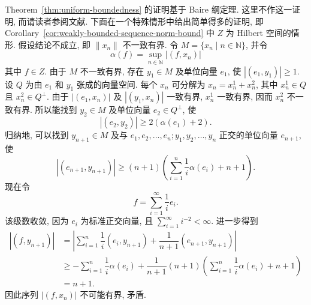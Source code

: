 Theorem~\ref{thm:uniform-boundedness} 的证明基于 Baire 纲定理. 这里不作这一证明, 而请读者参阅文献. 下面在一个特殊情形中给出简单得多的证明, 即 Corollary~\ref{cor:weakly-bounded-sequence-norm-bound} 中 $Z$ 为 Hilbert 空间的情形. 假设结论不成立, 即 $\|x_n\|$ 不一致有界. 令 $M=\{x_n\mid n\in\mathbb{N}\}$, 并令
\begin{equation}\label{eq:hilbert-unbounded-sequence-functional-supremum}
\alpha(f)=\sup_{n\in\mathbb{N}}|(f,x_n)|
\end{equation}
其中 $f\in Z$. 由于 $M$ 不一致有界, 存在 $y_1\in M$ 及单位向量 $e_1$, 使 $|(e_1,y_1)|\geq1$. 设 $Q$ 为由 $e_1$ 和 $y_1$ 张成的向量空间. 每个 $x_n$ 可分解为 $x_n=x_n^1+x_n^2$, 其中 $x_n^1\in Q$ 且 $x_n^2\in Q^\perp$. 由于 $|(e_1,x_n)|$ 及 $|(y_1,x_n)|$ 一致有界, $x_n^1$ 一致有界, 因而 $x_n^2$ 不一致有界. 所以能找到 $y_2\in M$ 及单位向量 $e_2\in Q^\perp$, 使
\begin{equation}\label{eq:hilbert-unbounded-sequence-second-vector}
|(e_2,y_2)|\geq2(\alpha(e_1)+2).
\end{equation}
归纳地, 可以找到 $y_{n+1}\in M$ 及与 $e_1,e_2,\ldots,e_n;y_1,y_2,\ldots,y_n$ 正交的单位向量 $e_{n+1}$, 使
\begin{equation}\label{eq:hilbert-unbounded-sequence-inductive-vectors}
|(e_{n+1},y_{n+1})|\geq(n+1)\left(\sum_{i=1}^n\dfrac{1}{i}\alpha(e_i)+n+1\right).
\end{equation}
现在令
\begin{equation}\label{eq:hilbert-unbounded-sequence-testing-series}
f=\sum_{i=1}^{\infty}\dfrac{1}{i}e_i.
\end{equation}
该级数收敛, 因为 $e_i$ 为标准正交向量, 且 $\sum_{i=1}^{\infty}i^{-2}<\infty$. 进一步得到
\begin{equation}\label{eq:hilbert-unbounded-sequence-contradiction}
\begin{aligned}
|(f,y_{n+1})|&=\left|\sum_{i=1}^n\dfrac{1}{i}(e_i,y_{n+1})+\dfrac{1}{n+1}(e_{n+1},y_{n+1})\right|\\
&\geq-\sum_{i=1}^n\dfrac{1}{i}\alpha(e_i)+\dfrac{1}{n+1}(n+1)\left(\sum_{i=1}^n\dfrac{1}{i}\alpha(e_i)+n+1\right)\\
&=n+1.
\end{aligned}
\end{equation}
因此序列 $|(f,x_n)|$ 不可能有界, 矛盾.
